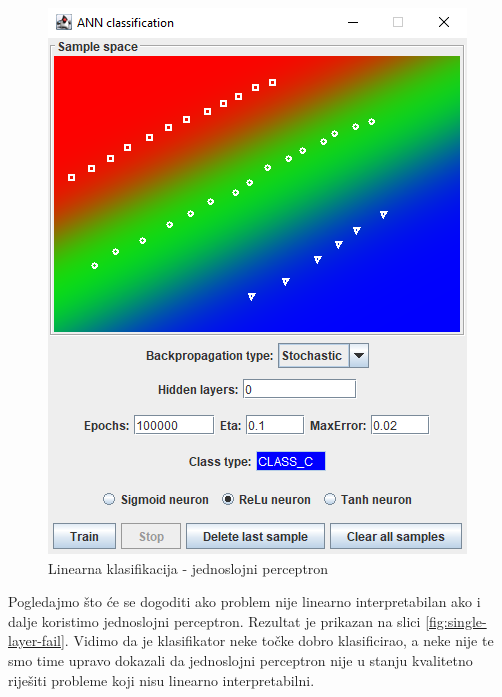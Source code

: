 \documentclass[times, utf8, zavrsni]{fer}
\begin{document}
\begin{figure}[H]
    \centering
    \includegraphics[scale=0.6]{img/single-layer.png}
    \caption[Caption for LOF]{Linearna klasifikacija - jednoslojni perceptron}
    \label{fig:single-layer-class}
\end{figure}

Pogledajmo što će se dogoditi ako problem nije linearno interpretabilan ako i dalje koristimo jednoslojni perceptron. Rezultat je prikazan na slici \ref{fig:single-layer-fail}. Vidimo da je klasifikator neke točke dobro klasificirao, a neke nije te smo time upravo dokazali da jednoslojni perceptron nije u stanju kvalitetno riješiti probleme koji nisu linearno interpretabilni.
\end{document}
